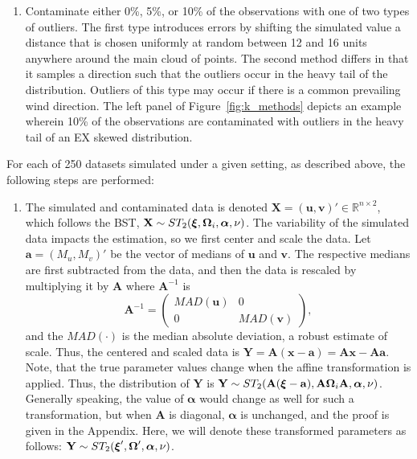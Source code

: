 \documentclass[12pt]{article}
\def\balpha{{\boldsymbol \alpha}}
\def\balpha{{\boldsymbol \alpha}}
\def\bxi{{\boldsymbol \xi}}
\def\ni{\noindent}
\def\bOmega{{\ensuremath\boldsymbol{\Omega}}}
\def\bOmega{{\ensuremath\boldsymbol{\Omega}}}
\begin{document}
\begin{doublespacing}
\begin{enumerate}
\item Contaminate  either 0\%, 5\%, or 10\% of the observations with one of two types of outliers.   The first type introduces  errors by shifting the simulated value a  distance that is chosen  uniformly at random between 12 and 16 units anywhere around the main cloud of points.  The second method differs in that it samples a direction such that the outliers occur in the heavy tail of the distribution. Outliers of this type may occur if there is a common prevailing wind direction.  The left panel of Figure~\ref{fig:k_methods} depicts an example wherein 10\% of the observations are contaminated with outliers in the heavy tail of an EX skewed distribution.
\end{enumerate}

\ni For each of 250 datasets simulated under a given setting, as described above, the following steps are performed:

\begin{enumerate}
\item The simulated and contaminated data is denoted $\mathbf{X} = (\mathbf{u},\mathbf{v})'\in \mathbb{R}^{n\times2}$, which follows the BST, $\mathbf{X} \sim ST_2(\bxi,\bOmega_i,\balpha,\nu)$.  The variability of the simulated data  impacts the estimation, so we  first center and scale the data.  Let $\mathbf{a}=(M_u,M_v)'$ be the vector of medians of $\mathbf{u}$ and $\mathbf{v}$.  The respective medians are first subtracted from the data, and then the data is rescaled by multiplying it by  $\mathbf{A}$ where $\mathbf{A}^{-1}$ is  $$\mathbf{A}^{-1}= \left(\begin{array}{cc}
    MAD(\mathbf{u}) & 0\\
    0 & {MAD(\mathbf{v})} \end{array} \right),$$
 and the $MAD(\cdot)$ is the median absolute deviation, a robust estimate of scale. Thus, the centered and scaled data is $\mathbf{Y} = \mathbf{A}(\mathbf{x}-\mathbf{a}) = \mathbf{A}\mathbf{x}-\mathbf{A}\mathbf{a}.$
Note, that the true parameter values change when the affine transformation is applied.  Thus, the distribution of $\mathbf{Y}$ is $\mathbf{Y} \sim ST_2(\mathbf{A}(\bxi-\mathbf{a}), \mathbf{A}\bOmega_i\mathbf{A},\balpha,\nu)$.  Generally speaking, the value of $\balpha$ would change as well for such a transformation, but when $\mathbf{A}$ is diagonal, $\balpha$ is unchanged, and the proof is given in the Appendix.  Here, we will denote these transformed parameters as follows:  $\mathbf{Y} \sim ST_2(\bxi',\bOmega',\balpha,\nu)$.


\end{enumerate}
\end{doublespacing}
\end{document}
